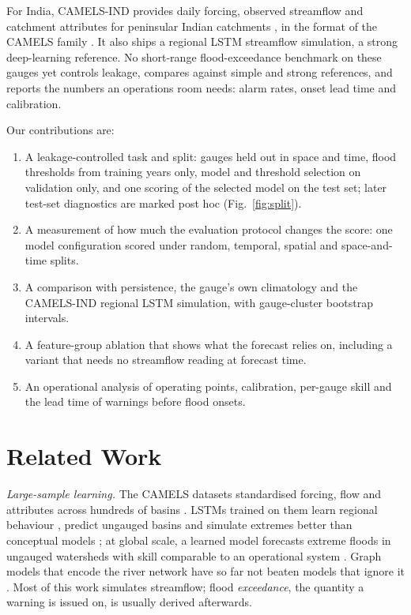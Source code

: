 \documentclass[conference]{IEEEtran}
\begin{document}
For India, CAMELS-IND provides daily forcing, observed streamflow and catchment attributes for peninsular Indian catchments \cite{Mangukiya2025}, in the format of the CAMELS family \cite{Newman2015,Addor2017}. It also ships a regional LSTM streamflow simulation, a strong deep-learning reference. No short-range flood-exceedance benchmark on these gauges yet controls leakage, compares against simple and strong references, and reports the numbers an operations room needs: alarm rates, onset lead time and calibration.

Our contributions are:
\begin{enumerate}
\item A leakage-controlled task and split: gauges held out in space and time, flood thresholds from training years only, model and threshold selection on validation only, and one scoring of the selected model on the test set; later test-set diagnostics are marked post hoc (Fig.~\ref{fig:split}).
\item A measurement of how much the evaluation protocol changes the score: one model configuration scored under random, temporal, spatial and space-and-time splits.
\item A comparison with persistence, the gauge's own climatology and the CAMELS-IND regional LSTM simulation, with gauge-cluster bootstrap intervals.
\item A feature-group ablation that shows what the forecast relies on, including a variant that needs no streamflow reading at forecast time.
\item An operational analysis of operating points, calibration, per-gauge skill and the lead time of warnings before flood onsets.
\end{enumerate}

\section{Related Work}
\textit{Large-sample learning.} The CAMELS datasets standardised forcing, flow and attributes across hundreds of basins \cite{Newman2015,Addor2017}. LSTMs trained on them learn regional behaviour \cite{Kratzert2019a}, predict ungauged basins \cite{Kratzert2019b} and simulate extremes better than conceptual models \cite{Frame2022}; at global scale, a learned model forecasts extreme floods in ungauged watersheds with skill comparable to an operational system \cite{Nearing2024}. Graph models that encode the river network have so far not beaten models that ignore it \cite{Kirschstein2024}. Most of this work simulates streamflow; flood \emph{exceedance}, the quantity a warning is issued on, is usually derived afterwards.
\end{document}
